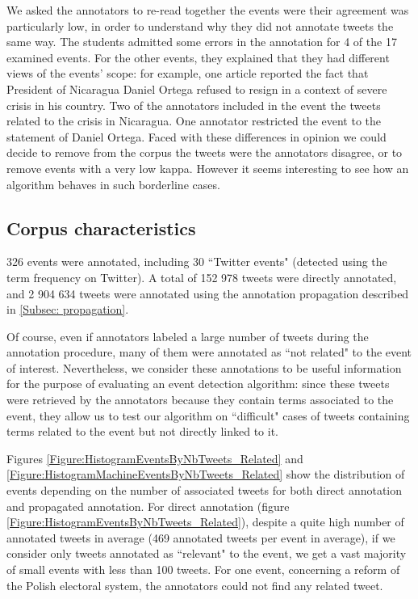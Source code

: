 We asked the annotators to re-read together the events were their agreement was particularly low, in order to understand why they did not annotate tweets the same way. The students admitted some errors in the annotation for 4 of the 17 examined events. For the other events, they explained that they had different views of the events' scope: for example, one article reported the fact that President of Nicaragua Daniel Ortega refused to resign in a context of severe crisis in his country. Two of the annotators included in the event the tweets related to the crisis in Nicaragua. One annotator restricted the event to the statement of Daniel Ortega. Faced with these differences in opinion we could decide to remove from the corpus the tweets were the annotators disagree, or to remove events with a very low kappa. However it seems interesting to see how an algorithm behaves in such borderline cases.



	\subsection{Corpus characteristics}
	326 events were annotated, including 30 ``Twitter events" (detected using the term frequency on Twitter). A total of 152 978 tweets were directly annotated, and 2 904 634 tweets were annotated using the annotation propagation described in \ref{Subsec: propagation}. 


Of course, even if annotators labeled a large number of tweets during the annotation procedure, many of them were annotated as ``not related" to the event of interest. Nevertheless, we consider these annotations to be useful information for the purpose of evaluating an event detection algorithm: since these tweets were retrieved by the annotators because they contain terms associated to the event, they allow us to test our algorithm on ``difficult" cases of tweets containing terms related to the event but not directly linked to it. 


Figures \ref{Figure:HistogramEventsByNbTweets_Related} and \ref{Figure:HistogramMachineEventsByNbTweets_Related} show the distribution of events depending on the number of associated tweets for both direct annotation and propagated annotation.  For direct annotation (figure \ref{Figure:HistogramEventsByNbTweets_Related}), despite a quite high number of annotated tweets in average (469 annotated tweets per event in average), if we consider only tweets annotated as ``relevant" to the event, we get a vast majority of small events with less than 100 tweets. For one event, concerning a reform of the Polish electoral system,  the annotators could not find any related tweet. 


